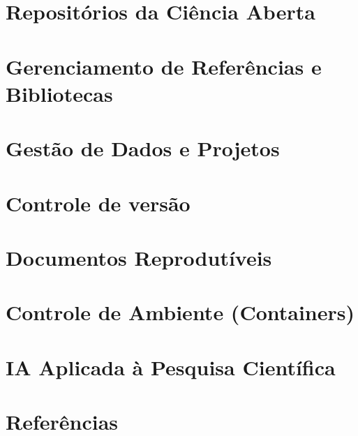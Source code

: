 \documentclass[
  a4paper,
]{article}
\newlength{\cslhangindent}
\newenvironment{CSLReferences}[2] %
 {\begin{list}{}{%
  \setlength{\itemindent}{0pt}
  \setlength{\leftmargin}{0pt}
  \setlength{\parsep}{0pt}
  \ifodd #1
   \setlength{\leftmargin}{\cslhangindent}
   \setlength{\itemindent}{-1\cslhangindent}
  \fi
  \setlength{\itemsep}{#2\baselineskip}}}
 {\end{list}}
\begin{document}

\section{Repositórios da Ciência Aberta}\label{sec-osf}


\section{Gerenciamento de Referências e Bibliotecas}\label{sec-zotero}


\section{Gestão de Dados e Projetos}\label{sec-project}


\section{Controle de versão}\label{sec-git}


\section{Documentos Reprodutíveis}\label{sec-quarto}


\section{Controle de Ambiente (Containers)}\label{sec-docker}


\section{IA Aplicada à Pesquisa Científica}\label{sec-AI}


\section*{Referências}\label{referuxeancias}


\label{refs}
\begin{CSLReferences}{0}{1}
\end{CSLReferences}
\end{document}
